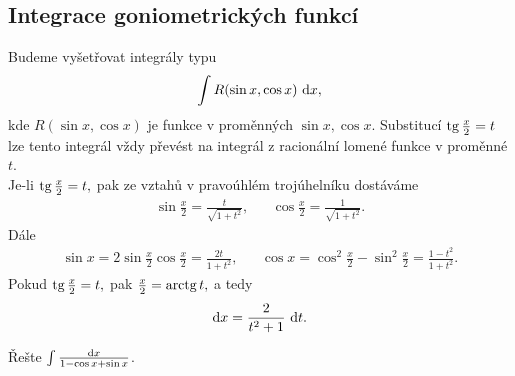 \subsection*{Integrace goniometrických funkcí}
\begin{pozn}
    Budeme vyšetřovat integrály typu
    $$\int R(\sin x, \cos x) \, \mathop{}\!\mathrm{d} x,$$
    kde $R(\sin x, \cos x)$ je funkce v proměnných $\sin x, \cos x.$ Substitucí
    $\operatorname{tg} \frac{x}{2}=t$ lze tento integrál vždy převést na integrál z racionální
    lomené funkce v proměnné $t$. \\
    Je-li $\operatorname{tg} \frac{x}{2}=t,$ pak ze vztahů v pravoúhlém trojúhelníku dostáváme
    \begin{align*}
        \sin \frac{x}{2}=\frac{t}{\sqrt{1+t^2} }, & & \cos \frac{x}{2}=\frac{1}{\sqrt{1+t^2} }.
    \end{align*}
    Dále
    \begin{align*}
        \sin x = 2\sin \frac{x}{2}\cos \frac{x}{2}=\frac{2t}{1+t^2}, & &
        \cos x = \cos^2 \frac{x}{2}-\sin^2 \frac{x}{2}=\frac{1-t^2}{1+t^2}.
    \end{align*}
    Pokud $\operatorname{tg} \frac{x}{2}=t,$ pak $\frac{x}{2}=\operatorname{arctg} t,$ a tedy
    $$\mathop{}\!\mathrm{d} x = \frac{2}{t^2+1}\, \mathop{}\!\mathrm{d} t.$$
\end{pozn}

\begin{priklad}
Řešte $\int \frac{\mathop{}\!\mathrm{d} x}{1-\cos x+\sin x}$.
\end{priklad}

